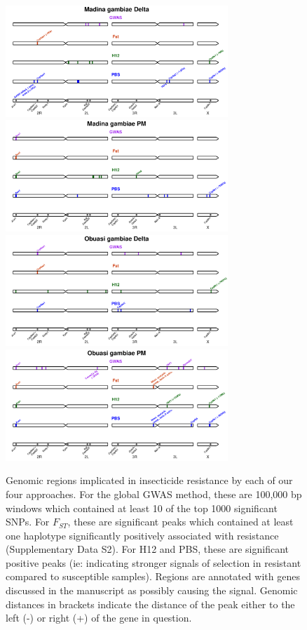 \documentclass[a4paper,12pt]{article}
\begin{document}
\begin{figure}[h]
	\vskip 0.4cm
	\hspace{-0.3cm}\includegraphics*[width = 8.4cm]{../supplementary_implicated_regions/Madina_gambiae_Delta_implicated_regions.pdf}
	\hspace{-0.3cm}\includegraphics*[width = 8.4cm]{../supplementary_implicated_regions/Madina_gambiae_PM_implicated_regions.pdf}
	\vskip 0.4cm
	\hspace{-0.3cm}\includegraphics*[width = 8.4cm]{../supplementary_implicated_regions/Obuasi_gambiae_Delta_implicated_regions.pdf}
	\hspace{-0.3cm}\includegraphics*[width = 8.4cm]{../supplementary_implicated_regions/Obuasi_gambiae_PM_implicated_regions.pdf}
	\caption{\footnotesize Genomic regions implicated in insecticide resistance by each of our four approaches. For the global GWAS method, these are 100,000 bp windows which contained at least 10 of the top 1000 significant SNPs. For $F_{ST}$, these are significant peaks which contained at least one haplotype significantly positively associated with resistance (Supplementary Data S2). For H12 and PBS, these are significant positive peaks (ie: indicating stronger signals of selection in resistant compared to susceptible samples). Regions are annotated with genes discussed in the manuscript as possibly causing the signal. Genomic distances in brackets indicate the distance of the peak either to the left (-) or right (+) of the gene in question.}
	\label{FigS4}
\end{figure}
\end{document}
